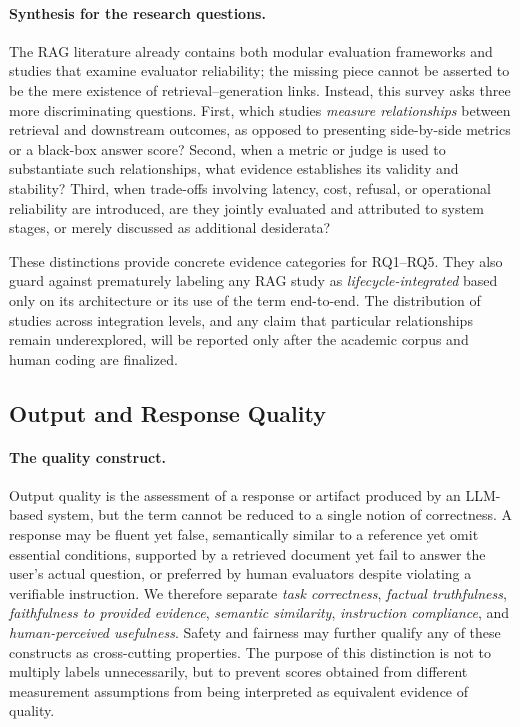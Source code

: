 \paragraph{Synthesis for the research questions.}
The RAG literature already contains both modular evaluation frameworks and studies that examine evaluator reliability; the missing piece cannot be asserted to be the mere existence of retrieval--generation links. Instead, this survey asks three more discriminating questions. First, which studies \emph{measure relationships} between retrieval and downstream outcomes, as opposed to presenting side-by-side metrics or a black-box answer score? Second, when a metric or judge is used to substantiate such relationships, what evidence establishes its validity and stability? Third, when trade-offs involving latency, cost, refusal, or operational reliability are introduced, are they jointly evaluated and attributed to system stages, or merely discussed as additional desiderata?

These distinctions provide concrete evidence categories for RQ1--RQ5. They also guard against prematurely labeling any RAG study as \emph{lifecycle-integrated} based only on its architecture or its use of the term end-to-end. The distribution of studies across integration levels, and any claim that particular relationships remain underexplored, will be reported only after the academic corpus and human coding are finalized.

\subsection{Output and Response Quality}
\label{sec:output-quality}

\paragraph{The quality construct.}
Output quality is the assessment of a response or artifact produced by an LLM-based system, but the term cannot be reduced to a single notion of correctness. A response may be fluent yet false, semantically similar to a reference yet omit essential conditions, supported by a retrieved document yet fail to answer the user's actual question, or preferred by human evaluators despite violating a verifiable instruction. We therefore separate \emph{task correctness}, \emph{factual truthfulness}, \emph{faithfulness to provided evidence}, \emph{semantic similarity}, \emph{instruction compliance}, and \emph{human-perceived usefulness}. Safety and fairness may further qualify any of these constructs as cross-cutting properties. The purpose of this distinction is not to multiply labels unnecessarily, but to prevent scores obtained from different measurement assumptions from being interpreted as equivalent evidence of quality.


